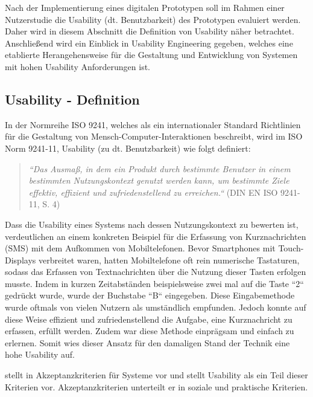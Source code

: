 Nach der Implementierung eines digitalen Prototypen soll im Rahmen einer Nutzerstudie die Usability (dt. Benutzbarkeit) des Prototypen evaluiert werden.
Daher wird in diesem Abschnitt die Definition von Usability näher betrachtet. Anschließend wird ein Einblick in Usability Engineering gegeben, welches eine etablierte Herangehensweise für
die Gestaltung und Entwicklung von Systemen mit hohen Usability Anforderungen ist. 

\subsection{Usability - Definition} \label{UsaDef}

In der Normreihe ISO 9241, welches als ein internationaler Standard Richtlinien für die Gestaltung von Mensch-Computer-Interaktionen beschreibt, wird im ISO Norm 9241-11,  Usability (zu dt. Benutzbarkeit) wie folgt definiert:

\begin{quote}\textit{``Das Ausmaß, in dem ein Produkt durch bestimmte Benutzer in einem bestimmten Nutzungskontext genutzt werden kann, um bestimmte Ziele effektiv, effizient und zufriedenstellend zu erreichen.``} (DIN EN ISO 9241-11, S. 4)\end{quote}

Dass die Usability eines Systems nach dessen Nutzungskontext zu bewerten ist, verdeutlichen \citeauthor{MichaelRichter2016} an einem konkreten Beispiel für die Erfassung 
von Kurznachrichten (SMS) mit dem Aufkommen von Mobiltelefonen. Bevor Smartphones mit Touch-Displays verbreitet waren, hatten Mobiltelefone oft rein numerische Tastaturen, sodass das Erfassen 
von Textnachrichten über die Nutzung dieser Tasten erfolgen musste. Indem in kurzen Zeitabständen beispielsweise zwei mal auf die Taste ``2`` gedrückt wurde, wurde der Buchstabe 
``B`` eingegeben. Diese Eingabemethode wurde oftmals von vielen Nutzern als umständlich empfunden. Jedoch konnte auf diese Weise effizient und zufriedenstellend die Aufgabe, eine Kurznachricht 
zu erfassen, erfüllt werden. Zudem war diese Methode einprägsam und einfach zu erlernen. Somit wies dieser Ansatz für den damaligen Stand der Technik eine hohe Usability auf. \cite[S.~10]{MichaelRichter2016} 

\citeauthor{Nielsen1994} stellt in \cite[S.~25]{Nielsen1994} Akzeptanzkriterien für Systeme vor und stellt Usability als ein Teil dieser Kriterien vor.
Akzeptanzkriterien unterteilt er in soziale und praktische Kriterien.

